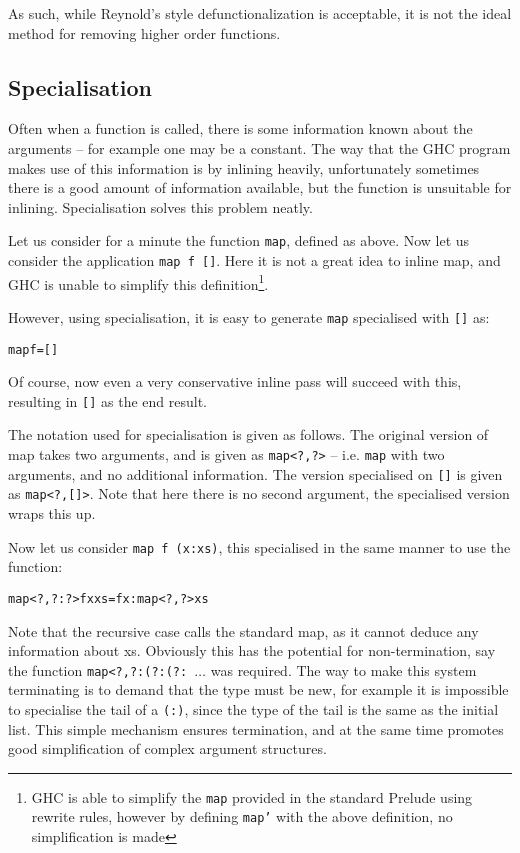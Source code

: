\documentclass[preprint]{sigplanconf}
\newcommand{\T}[1]{\texttt{#1}}
\newenvironment{code}{\begin{alltt}\small}{\end{alltt}}
\begin{document}
As such, while Reynold's style defunctionalization is acceptable, it is not the
ideal method for removing higher order functions.

\subsection{Specialisation}

Often when a function is called, there is some information known about the
arguments -- for example one may be a constant. The way that the GHC program
makes use of this information is by inlining heavily, unfortunately sometimes
there is a good amount of information available, but the function is unsuitable
for inlining. Specialisation solves this problem neatly.

Let us consider for a minute the function \T{map}, defined as above. Now let us
consider the application \T{map f []}. Here it is not a great idea to inline
map, and GHC is unable to simplify this definition\footnote{GHC is able to
simplify the \T{map} provided in the standard Prelude using rewrite rules,
however by defining \T{map'} with the above definition, no simplification is
made}.

However, using specialisation, it is easy to generate \T{map} specialised with
\T{[]} as:

\begin{code}
 map f = []
\end{code}

Of course, now even a very conservative inline pass will succeed with this,
resulting in \T{[]} as the end result.

The notation used for specialisation is given as follows. The original version
of map takes two arguments, and is given as \T{map<?,?>} -- i.e. \T{map} with
two arguments, and no additional information. The version specialised on \T{[]}
is given as \T{map<?,[]>}. Note that here there is no second argument, the
specialised version wraps this up.

Now let us consider \T{map f (x:xs)}, this specialised in the same manner to
use the function:

\begin{code}
 map<?,?:?> f x xs = f x : map<?,?> xs
\end{code}

Note that the recursive case calls the standard map, as it cannot deduce any
information about xs. Obviously this has the potential for non-termination, say
the function \T{map<?,?:(?:(?: $\ldots$} was required. The way to make this
system terminating is to demand that the type must be new, for example it is
impossible to specialise the tail of a \T{(:)}, since the type of the tail is
the same as the initial list. This simple mechanism ensures termination, and at
the same time promotes good simplification of complex argument structures.
\end{document}
